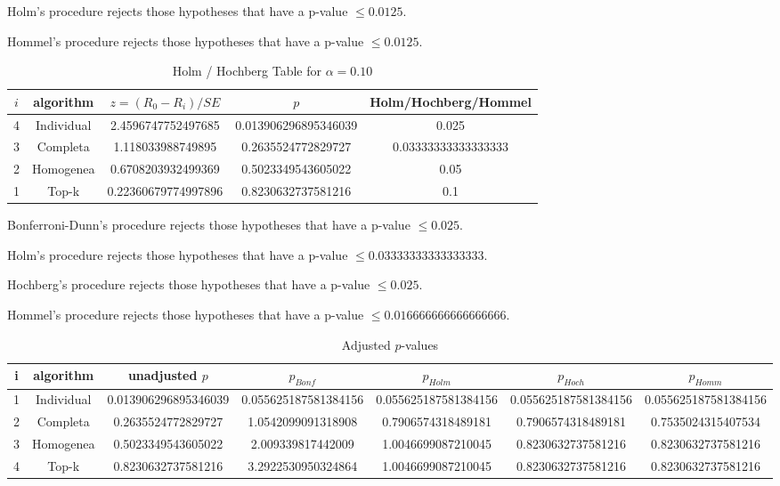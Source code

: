 \documentclass[a4paper,10pt]{article}
\begin{document}
\begin{landscape}
Holm's procedure rejects those hypotheses that have a p-value $\le0.0125$.


Hommel's procedure rejects those hypotheses that have a p-value $\le0.0125$.


\begin{table}[!htp]
\centering\tiny
\caption{Holm / Hochberg Table for $\alpha=0.10$}
\begin{tabular}{ccccc}
$i$&algorithm&$z=(R_0 - R_i)/SE$&$p$&Holm/Hochberg/Hommel\\
\hline
4&Individual&2.4596747752497685&0.013906296895346039&0.025\\
3&Completa&1.118033988749895&0.2635524772829727&0.03333333333333333\\
2&Homogenea&0.6708203932499369&0.5023349543605022&0.05\\
1&Top-k&0.22360679774997896&0.8230632737581216&0.1\\
\hline
\end{tabular}
\end{table}
Bonferroni-Dunn's procedure rejects those hypotheses that have a p-value $\le0.025$.


Holm's procedure rejects those hypotheses that have a p-value $\le0.03333333333333333$.


Hochberg's procedure rejects those hypotheses that have a p-value $\le0.025$.


Hommel's procedure rejects those hypotheses that have a p-value $\le0.016666666666666666$.


\begin{table}[!htp]
\centering\tiny
\caption{Adjusted $p$-values}
\begin{tabular}{ccccccc}
i&algorithm&unadjusted $p$&$p_{Bonf}$&$p_{Holm}$&$p_{Hoch}$&$p_{Homm}$\\
\hline
1&Individual&0.013906296895346039&0.055625187581384156&0.055625187581384156&0.055625187581384156&0.055625187581384156\\
2&Completa&0.2635524772829727&1.0542099091318908&0.7906574318489181&0.7906574318489181&0.7535024315407534\\
3&Homogenea&0.5023349543605022&2.009339817442009&1.0046699087210045&0.8230632737581216&0.8230632737581216\\
4&Top-k&0.8230632737581216&3.2922530950324864&1.0046699087210045&0.8230632737581216&0.8230632737581216\\
\hline
\end{tabular}
\end{table}


\end{landscape}
\end{document}
